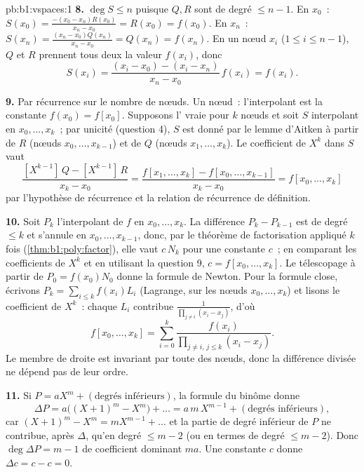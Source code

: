 \begin{solution}{pb:b1:vspaces:1}
\textbf{8.} $\deg S \leq n$ puisque $Q, R$ sont de degré $\leq n - 1$.
En $x_0$~: $S(x_0) = \frac{-(x_0 - x_n) R(x_0)}{x_n - x_0} =
R(x_0) = f(x_0)$. En $x_n$~: $S(x_n) = \frac{(x_n - x_0)
Q(x_n)}{x_n - x_0} = Q(x_n) = f(x_n)$. En un nœud  $x_i$
($1 \leq i \leq n-1$), $Q$ et $R$ prennent tous deux la valeur
$f(x_i)$, donc
\[
S(x_i) = \frac{(x_i - x_0) - (x_i - x_n)}{x_n - x_0}\, f(x_i)
= f(x_i) .
\]

\textbf{9.} Par récurrence sur le nombre de nœuds. Un nœud~:
l'interpolant est la constante $f(x_0) = f[x_0]$. Supposons
l' vraie pour $k$ nœuds et soit $S$ interpolant en $x_0,
\dots, x_k$~; par unicité (question 4), $S$ est donné par le lemme
d'Aitken à partir de $R$ (nœuds $x_0, \dots, x_{k-1}$) et de $Q$
(nœuds $x_1, \dots, x_k$). Le coefficient de $X^{k}$ dans $S$ vaut
\[
\frac{[X^{k-1}]\,Q - [X^{k-1}]\,R}{x_k - x_0}
= \frac{f[x_1, \dots, x_k] - f[x_0, \dots, x_{k-1}]}{x_k - x_0}
= f[x_0, \dots, x_k]
\]
par l'hypothèse de récurrence et la relation de récurrence de
définition.

\textbf{10.} Soit $P_k$ l'interpolant de $f$ en $x_0, \dots, x_k$. La
différence $P_k - P_{k-1}$ est de degré $\leq k$ et s'annule en
$x_0, \dots, x_{k-1}$, donc, par le théorème de factorisation appliqué
$k$ fois (\cref{thm:b1:poly:factor}), elle vaut $c\,N_k$ pour une
constante $c$~; en comparant les coefficients de $X^{k}$ et en
utilisant la question 9, $c = f[x_0, \dots, x_k]$. Le télescopage à
partir de $P_0 = f(x_0) N_0$ donne la formule de Newton. Pour la
formule close, écrivons $P_k = \sum_{i \leq
k} f(x_i) L_i$ (Lagrange, sur les nœuds $x_0, \dots, x_k$) et lisons
le coefficient de $X^{k}$~: chaque $L_i$ contribue
$\frac{1}{\prod_{j \neq i}(x_i - x_j)}$, d'où
\[
f[x_0, \dots, x_k] = \sum_{i=0}^{k}
\frac{f(x_i)}{\prod_{j \neq i,\, j \leq k}(x_i - x_j)} .
\]
Le membre de droite est invariant par toute  des nœuds, donc
la différence divisée ne dépend pas de leur ordre.

\textbf{11.} Si $P = a X^m + (\text{degrés inférieurs})$, la formule du
binôme donne
\[
\Delta P = a\bigl((X+1)^m - X^m\bigr) + \dots
= a\,m\,X^{m-1} + (\text{degrés inférieurs}),
\]
car $(X+1)^m - X^m = m X^{m-1} + \dots$ et la partie de degré inférieur
de $P$ ne contribue, après $\Delta$, qu'en degré $\leq m - 2$ (ou en
termes de degré $\leq m-2$). Donc
$\deg \Delta P = m - 1$ de coefficient dominant $m a$. Une constante
$c$ donne $\Delta c = c - c = 0$.


\end{solution}

